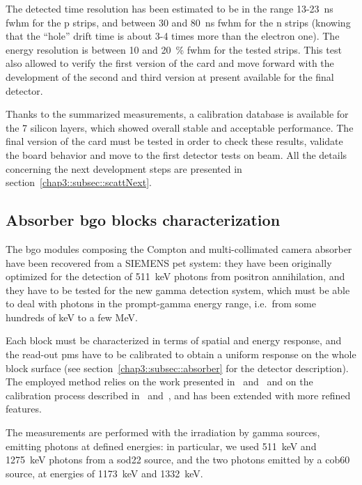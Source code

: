 The detected time resolution has been estimated to be in the range 13-23~ns \gls{fwhm} for the p strips, and between 30 and 80~ns \gls{fwhm} for the n strips (knowing that the \enquote{hole} drift time is about 3-4 times more than the electron one). The energy resolution is between 10 and 20~\% \gls{fwhm} for the tested strips. This test also allowed to verify the first version of the card and move forward with the development of the second and third version at present available for the final detector.

Thanks to the summarized measurements, a calibration database is available for the 7 silicon layers, which showed overall stable and acceptable performance. The final version of the card must be tested in order to check these results, validate the board behavior and move to the first detector tests on beam. All the details concerning the next development steps are presented in section~\ref{chap3::subsec::scattNext}.    


\subsection{Absorber \gls{bgo} blocks characterization}\label{chap3::subsec::absBGOchar}

The \gls{bgo} modules composing the Compton and multi-collimated camera absorber have been recovered from a SIEMENS \gls{pet} system: they have been originally optimized for the detection of 511~keV photons from positron annihilation, and they have to be tested for the new gamma detection system, which must be able to deal with photons in the prompt-gamma energy range, i.e.~from some hundreds of keV to a few MeV.
 
Each block must be characterized in terms of spatial and energy response, and the read-out \glspl{pm} have to be calibrated to obtain a uniform response on the whole block surface (see section~\ref{chap3::subsec::absorber} for the detector description). The employed method relies on the work presented in~\cite{Rogers1994} and~\cite{Tornai1994} and on the calibration process described in~\cite{Golnik2015} and~\cite{HuesoGonzalez2015}, and has been extended with more refined features.

The measurements are performed with the irradiation by gamma sources, emitting photons at defined energies: in particular, we used 511~keV and 1275~keV photons from a \gls{sod22} source, and the two photons emitted by a \gls{cob60} source, at energies of 1173~keV and 1332~keV.


